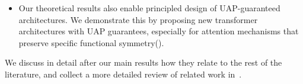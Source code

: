\documentclass{article}
\begin{document}
\begin{itemize}

        \item Our theoretical results also enable principled design of UAP-guaranteed architectures. We demonstrate this by proposing new transformer architectures with UAP guarantees, especially for attention mechanisms that preserve specific functional symmetry().

\end{itemize}
We discuss in detail after our main results how they relate to the rest of the literature, and collect a more detailed review of related work in~.




\end{document}
